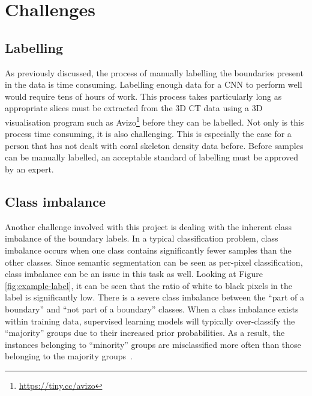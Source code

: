\section{Challenges}
\label{sec:challenges}


\subsection{Labelling}

As previously discussed, the process of manually labelling the boundaries present in the data is time consuming. Labelling enough data for a CNN to perform well would require tens of hours of work. This process takes particularly long as appropriate slices must be extracted from the 3D CT data using a 3D visualisation program such as Avizo\footnote{\url{https://tiny.cc/avizo}} before they can be labelled. Not only is this process time consuming, it is also challenging. This is especially the case for a person that has not dealt with coral skeleton density data before. Before samples can be manually labelled, an acceptable standard of labelling must be approved by an expert.

\subsection{Class imbalance}

Another challenge involved with this project is dealing with the inherent class imbalance of the boundary labels. In a typical classification problem, class imbalance occurs when one class contains significantly fewer samples than the other classes. Since semantic segmentation can be seen as per-pixel classification, class imbalance can be an issue in this task as well. Looking at Figure \ref{fig:example-label}, it can be seen that the ratio of white to black pixels in the label is significantly low. There is a severe class imbalance between the ``part of a boundary'' and ``not part of a boundary'' classes. When a class imbalance exists within training data, supervised learning models will typically over-classify the ``majority'' groups due to their increased prior probabilities. As a result, the instances belonging to ``minority'' groups are misclassified more often than those belonging to the majority groups~\cite{classimbalance}.

